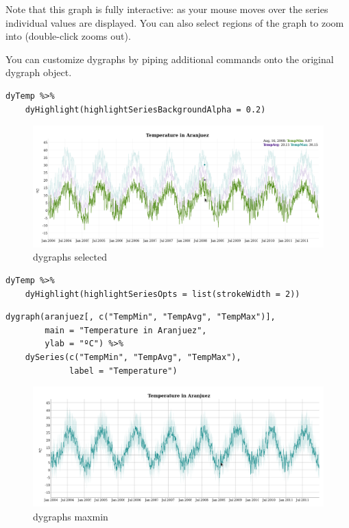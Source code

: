 \documentclass[smallroyalvopaper]{memoir}
\begin{document}
Note that this graph is fully interactive: as your mouse moves over the series individual values are displayed. You can also select regions of the graph to zoom into (double-click zooms out).

You can customize dygraphs by piping additional commands onto the original dygraph object. 

\lstset{language=r,label= ,caption= ,captionpos=b,numbers=none}
\begin{lstlisting}
dyTemp %>%
    dyHighlight(highlightSeriesBackgroundAlpha = 0.2)
\end{lstlisting}

\begin{figure}[htbp]
\centering
\includegraphics[width=.9\linewidth]{figs/dygraphs_aranjuez_selected.png}
\caption{dygraphs selected \label{fig:dygraphs_selected}}
\end{figure}

\lstset{language=r,label= ,caption= ,captionpos=b,numbers=none}
\begin{lstlisting}
dyTemp %>%
    dyHighlight(highlightSeriesOpts = list(strokeWidth = 2))
\end{lstlisting}


\lstset{language=r,label= ,caption= ,captionpos=b,numbers=none}
\begin{lstlisting}
dygraph(aranjuez[, c("TempMin", "TempAvg", "TempMax")],
        main = "Temperature in Aranjuez",
        ylab = "ºC") %>%
    dySeries(c("TempMin", "TempAvg", "TempMax"),
             label = "Temperature")
\end{lstlisting}

\begin{figure}[htbp]
\centering
\includegraphics[width=.9\linewidth]{figs/dygraphs_aranjuez_maxmin.png}
\caption{dygraphs maxmin \label{fig:dygraphs_maxmin}}
\end{figure}
\end{document}
